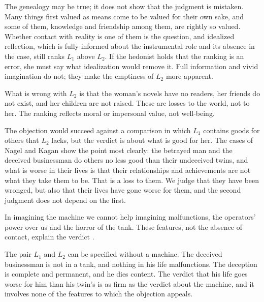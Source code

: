 \documentclass{situationist-preprint}
\begin{document}
\begin{reply}
The genealogy may be true; it does not show that the judgment is mistaken. Many things first valued as means come to be valued for their own sake, and some of them, knowledge and friendship among them, are rightly so valued. Whether contact with reality is one of them is the question, and idealized reflection, which is fully informed about the instrumental role and its absence in the case, still ranks $L_1$ above $L_2$. If the hedonist holds that the ranking is an error, she must say what idealization would remove it. Full information and vivid imagination do not; they make the emptiness of $L_2$ more apparent.
\end{reply}

\begin{objection}\label{o:others}
What is wrong with $L_2$ is that the woman's novels have no readers, her friends do not exist, and her children are not raised. These are losses to the world, not to her. The ranking reflects moral or impersonal value, not well-being.
\end{objection}

\begin{reply}
The objection would succeed against a comparison in which $L_1$ contains goods for others that $L_2$ lacks, but the verdict is about what is good for her. The cases of Nagel and Kagan show the point most clearly: the betrayed man and the deceived businessman do others no less good than their undeceived twins, and what is worse in their lives is that their relationships and achievements are not what they take them to be. That is a loss to them. We judge that they have been wronged, but also that their lives have gone worse for them, and the second judgment does not depend on the first.
\end{reply}

\begin{objection}\label{o:contam}
In imagining the machine we cannot help imagining malfunctions, the operators' power over us and the horror of the tank. These features, not the absence of contact, explain the verdict \citep{Weijers2014}.
\end{objection}

\begin{reply}
The pair $L_1$ and $L_2$ can be specified without a machine. The deceived businessman is not in a tank, and nothing in his life malfunctions. The deception is complete and permanent, and he dies content. The verdict that his life goes worse for him than his twin's is as firm as the verdict about the machine, and it involves none of the features to which the objection appeals.
\end{reply}
\end{document}
